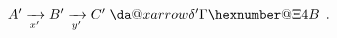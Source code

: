 \documentclass[preview]{standalone}
\makeatletter
\newcommand*{\da@xarrow}[7]{%
                                         \sbox0{$\ifx#7\scriptstyle\scriptscriptstyle\else\scriptstyle\fi#5#1#6\m@th$}%
                                         \sbox2{$\ifx#7\scriptstyle\scriptscriptstyle\else\scriptstyle\fi#5#2#6\m@th$}%
                                         \sbox4{$#7\dabar@\m@th$}%
                                         \dimen@=\wd0 %
                                         \ifdim\wd2 >\dimen@
                                           \dimen@=\wd2 %
                                         \fi
                                         \count@=2 %
                                         \def\da@bars{\dabar@\dabar@}%
                                         \@whiledim\count@\wd4<\dimen@\do{%
                                           \advance\count@\@ne
                                           \expandafter\def\expandafter\da@bars\expandafter{%
                                             \da@bars
                                             \dabar@ 
                                           }%
                                         }%
                                         \mathrel{#3}%
                                         \mathrel{%
                                           \mathop{\da@bars}\limits
                                           \ifx\\#1\\%
                                           \else
                                             _{\copy0}%
                                           \fi
                                           \ifx\\#2\\%
                                           \else
                                             ^{\copy2}%
                                           \fi
                                         }%
                                         \mathrel{#4}%
                                       }
\newcommand*{\da@rightarrow}{\mathchar"0\hexnumber@\symAMSa 4B }
\newcommand*{\xdashrightarrow}[2][]{%
                                         \mathrel{%
                                           \mathpalette{\da@xarrow{#1}{#2}{}\da@rightarrow{\,}{}}{}%
                                         }%
                                       }
\makeatother
\begin{document}
\begin{center}
$A'\xrightarrow[x']{}B'\xrightarrow[y']{}C'\xdashrightarrow[\delta']{}.$
\end{center}
\end{document}
